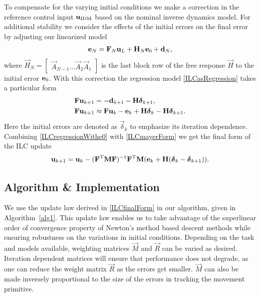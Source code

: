 To compensate for the varying initial conditions we make a correction in the reference control input $\boldsymbol{\mathrm{u}}_{\mathrm{IDM}}$ based on the nominal inverse dynamics model. For additional stability we consider the effects of the initial errors on the final error by adjusting our linearized model
%
\begin{equation}
\begin{aligned}
\boldsymbol{\mathrm{e}}_N &= \boldsymbol{\mathrm{F}}_N\boldsymbol{\mathrm{u}}_L + \boldsymbol{\mathrm{H}}_N\boldsymbol{\mathrm{e}}_0 + \boldsymbol{\mathrm{d}}_N, \\
\end{aligned}
\label{adjustedLiftedLTV}
\end{equation}
%
\noindent where $\vec{H}_N = \begin{bmatrix} \vec{A}_{N-1} \ldots \vec{A}_2 \vec{A}_1 \end{bmatrix}$ is the last block row of the free response $\vec{H}$ to the initial error $\boldsymbol{\mathrm{e}}_0$. With this correction the regression model \eqref{ILCasRegression} takes a particular form
%
\begin{equation}
\begin{aligned}
\boldsymbol{\mathrm{F}}\boldsymbol{\mathrm{u}}_{k+1} &= -\boldsymbol{\mathrm{d}}_{k+1} - \boldsymbol{\mathrm{H}}\boldsymbol{\mathrm{\delta}}_{k+1},\\
\boldsymbol{\mathrm{F}}\boldsymbol{\mathrm{u}}_{k+1} &\approx \boldsymbol{\mathrm{F}}\boldsymbol{\mathrm{u}}_{k} - \boldsymbol{\mathrm{e}}_k + \boldsymbol{\mathrm{H}}\boldsymbol{\mathrm{\delta}}_{k} - \boldsymbol{\mathrm{H}}\boldsymbol{\mathrm{\delta}}_{k+1}.
\end{aligned}
\label{ILCregressionWithe0}
\end{equation}
%
\noindent Here the initial errors are denoted as $\vec{\delta}_k$ to emphasize its iteration dependence. Combining \eqref{ILCregressionWithe0} with \eqref{ILCmayerForm} we get the final form of the ILC update
%
\begin{equation}
\begin{aligned}
\boldsymbol{\mathrm{u}}_{k+1} &= \boldsymbol{\mathrm{u}}_k - (\boldsymbol{\mathrm{F}}^{\mathrm{T}}\boldsymbol{\mathrm{M}}\boldsymbol{\mathrm{F}})^{-1}\boldsymbol{\mathrm{F}}^{\mathrm{T}}\boldsymbol{\mathrm{M}}(\boldsymbol{\mathrm{e}}_k + \boldsymbol{\mathrm{H}}(\boldsymbol{\mathrm{\delta}}_{k} - \boldsymbol{\mathrm{\delta}}_{k+1})).\\
\end{aligned}
\label{ILCfinalForm}
\end{equation}

\subsection{Algorithm \& Implementation}\label{algorithm}

We use the update law derived in \eqref{ILCfinalForm} in our algorithm, given in Algorithm~\ref{alg1}. This update law enables us to take advantage of the superlinear order of convergence property of Newton's method based descent methods while ensuring robustness on the variations in initial conditions. Depending on the task and models available, weighting matrices $\vec{M}$ and $\vec{R}$ can be varied as desired. Iteration dependent matrices will ensure that performance does not degrade, as one can reduce the weight matrix $\vec{R}$ as the errors get smaller. $\vec{M}$ can also be made inversely proportional to the size of the errors in tracking the movement primitive. %

